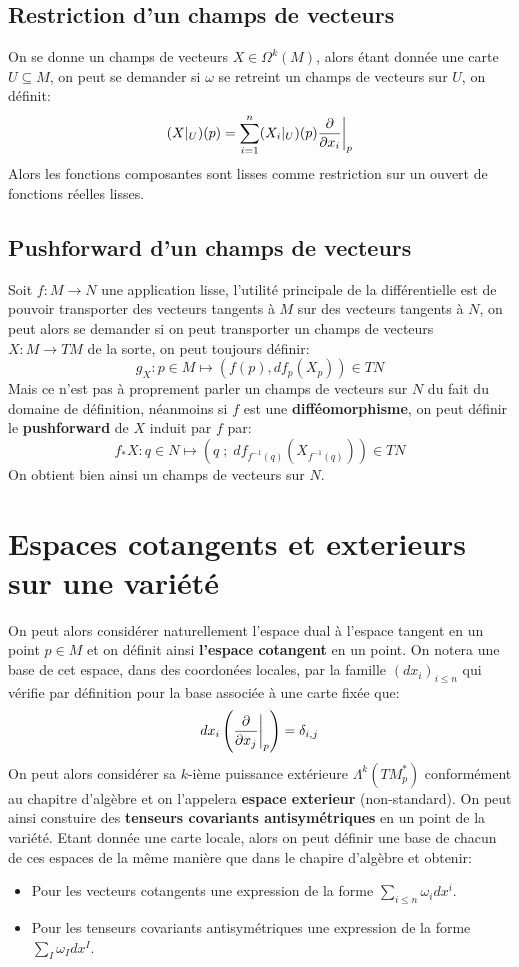    \section{Restriction d'un champs de vecteurs}
   On se donne un champs de vecteurs \( X \in \Omega^k(M) \), alors étant donnée une carte \( U \subseteq M \), on peut se demander si \( \omega \) se retreint un champs de vecteurs sur \( U \), on définit:
   \[ 
      (X|_U)(p) = \sum_{i =1}^{n}(X_i|_U)(p) \frac{\partial }{\partial x_i}\biggr|_p 
   \]
   Alors les fonctions composantes sont lisses comme restriction sur un ouvert de fonctions réelles lisses.
   \section{Pushforward d'un champs de vecteurs}
Soit \( f : M \longrightarrow N \) une application lisse, l'utilité principale de la différentielle est de pouvoir transporter des vecteurs tangents à \( M \) sur des vecteurs tangents à \( N \), on peut alors se demander si on peut transporter un champs de vecteurs \( X : M \longrightarrow TM \) de la sorte, on peut toujours définir:
\[ 
   g_X : p \in M \longmapsto (f(p), df_p(X_p)) \in TN
\]
Mais ce n'est pas à proprement parler un champs de vecteurs sur \( N \) du fait du domaine de définition, néanmoins si \( f \) est une \textbf{difféomorphisme}, on peut définir le \textbf{pushforward} de \( X \) induit par \( f \) par:
\[ 
   f_*X : q \in N \longmapsto (q \; ; \; df_{f^{-1}(q)}(X_{f^{-1}(q)})) \in TN
\]
On obtient bien ainsi un champs de vecteurs sur \( N \).
\chapter{Espaces cotangents et exterieurs sur une variété}
   On peut alors considérer naturellement l'espace dual à l'espace tangent en un point \( p \in M \) et on définit ainsi \textbf{l'espace cotangent} en un point. On notera une base de cet espace, dans des coordonées locales, par la famille \( (dx_i)_{i \leq n} \) qui vérifie par définition pour la base associée à une carte fixée que:
   \[ 
      dx_i\left(\frac{\partial }{\partial x_j}\biggr|_p\right) = \delta_{i, j}
   \]
   On peut alors considérer sa \( k \)-ième puissance extérieure \( \Lambda^k(TM_p^*) \) conformément au chapitre d'algèbre et on l'appelera \textbf{espace exterieur} (non-standard). On peut ainsi constuire des \textbf{tenseurs covariants antisymétriques} en un point de la variété. Etant donnée une carte locale, alors on peut définir une base de chacun de ces espaces de la même manière que dans le chapire d'algèbre et obtenir:
   \begin{itemize}
      \item Pour les vecteurs cotangents une expression de la forme \( \sum_{i \leq n} \omega_idx^i \).
      \item Pour les tenseurs covariants antisymétriques une expression de la forme \( \sum_{I} \omega_Idx^I \).
   \end{itemize}
